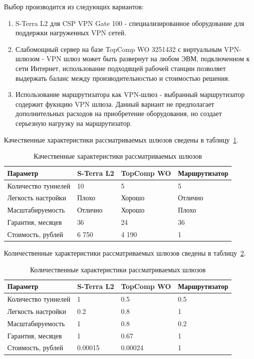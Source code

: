 \documentclass[russian,utf8,emptystyle]{eskdtext}
\begin{document}
Выбор производится из следующих вариантов:
\begin{enumerate}[label=\arabic*.]
\item S-Terra L2 для CSP VPN Gate 100 - специализированное оборудование для поддержки нагруженных VPN сетей.
\item Слабомощный сервер на базе TopComp WO 3251432 с виртуальным VPN-шлюзом - VPN шлюз может быть развернут на любом ЭВМ, подключенном к сети Интернет, использование подходящей рабочей станции позволяет выдержать баланс между производительностью и стоимостью решения.
\item Использование маршрутизатора как VPN-шлюз - выбранный маршрутизатор содержит фукнцию VPN шлюза. Данный вариант не предполагает дополнительных расходов на приобретение оборудования, но создает серьезную нагрузку на маршрутизатор.
\end{enumerate}

Качественные характеристики рассматриваемых шлюзов сведены в таблицу~\ref{tab:vpn-1}.

\begin{longtable}{p{7cm}|p{2cm}|p{2cm}|p{2cm}}
\caption{Качественные характеристики рассматриваемых шлюзов}
\label{tab:vpn-1} \\
Параметр                     & S-Terra L2 & TopComp WO & Маршрутизатор \\ 
\hline 
Количество туннелей          & 10         & 5          & 5        \\ 
Легкость настройки           & Плохо      & Хорошо     & Отлично  \\ 
Масштабируемость             & Отлично    & Хорошо     & Плохо    \\ 
Гарантия, месяцев            & 36         & 24         & 36       \\ 
Стоимость, рублей            & 6 750      & 4 190      & 1        \\
\end{longtable}

Количественные характеристики рассматриваемых шлюзов сведены в таблицу~\ref{tab:vpn-2}.

\begin{longtable}{p{7cm}|p{2cm}|p{2cm}|p{2cm}}
\caption{Количественные характеристики рассматриваемых шлюзов}
\label{tab:vpn-2} \\
Параметр                     & S-Terra L2 & TopComp WO & Маршрутизатор \\ 
\hline 
Количество туннелей          & 1          & 0.5        & 0.5        \\ 
Легкость настройки           & 0.2        & 0.8        & 1       \\ 
Масштабируемость             & 1          & 0.8        & 0.2    \\ 
Гарантия, месяцев            & 1          & 0.67       & 1       \\ 
Стоимость, рублей            & 0.00015    & 0.00024    & 1        \\
\end{longtable}
\end{document}

